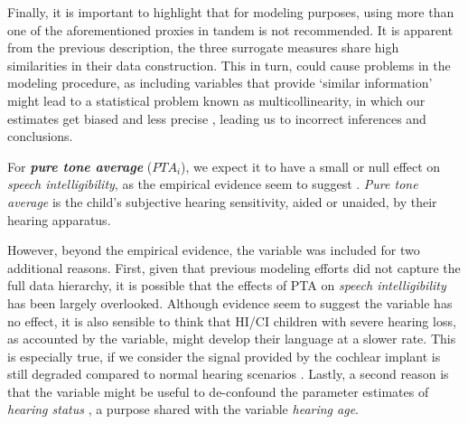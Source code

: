 Finally, it is important to highlight that for modeling purposes, using more than one of the aforementioned proxies in tandem is not recommended. It is apparent from the previous description, the three surrogate measures share high similarities in their data construction. This in turn, could cause problems in the modeling procedure, as including variables that provide `similar information' might lead to a statistical problem known as multicollinearity, in which our estimates get biased and less precise \cite{Farrar_et_al_1967}, leading us to incorrect inferences and conclusions.
%
\begin{comment}
	for the NH group uses the child's \textit{age} (at recording), the method cannot use the same variable for the other two groups. This is due to the fact that \textit{age} is merely used as a proxy, for the amount of time a child has been developing his(her) language. In that sense, more appropriate variables to use under the HI/CI group would be e.g. the \textit{device length of use}, which approximates the ``hearing age'' of such children, or their \textit{vocabulary size}, which resembles their "lexical age" \citep{Faes_et_al_2021}. For this research, we consider the \textit{device length of use} as the simplest one to implement.
\end{comment}

For \textbf{\textit{pure tone average}} ($PTA_{i}$), we expect it to have a small or null effect on \textit{speech intelligibility}, as the empirical evidence seem to suggest \cite{Boonen_et_al_2021}. \textit{Pure tone average} is the child's subjective hearing sensitivity, aided or unaided, by their hearing apparatus. 

However, beyond the empirical evidence, the variable was included for two additional reasons. First, given that previous modeling efforts did not capture the full data hierarchy, it is possible that the effects of PTA on \textit{speech intelligibility} has been largely overlooked. Although evidence seem to suggest the variable has no effect, it is also sensible to think that HI/CI children with severe hearing loss, as accounted by the variable, might develop their language at a slower rate. This is especially true, if we consider the signal provided by the cochlear implant is still degraded compared to normal hearing scenarios \cite{Drennan_et_al_2008}. Lastly, a second reason is that the variable might be useful to de-confound the parameter estimates of \textit{hearing status} \cite{Cinelli_et_al_2021}, a purpose shared with the variable \textit{hearing age}. 

